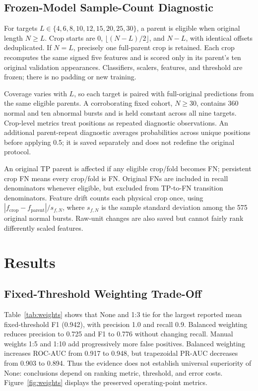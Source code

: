 \documentclass[10pt,twocolumn,letterpaper]{article}
\begin{document}
\subsection{Frozen-Model Sample-Count Diagnostic}
For targets $L\in\{4,6,8,10,12,15,20,25,30\}$, a parent is eligible when original length $N\geq L$. Crop starts are 0, $\lfloor(N-L)/2\rfloor$, and $N-L$, with identical offsets deduplicated. If $N=L$, precisely one full-parent crop is retained. Each crop recomputes the same signed five features and is scored only in its parent's ten original validation appearances. Classifiers, scalers, features, and threshold are frozen; there is no padding or new training.

Coverage varies with $L$, so each target is paired with full-original predictions from the same eligible parents. A corroborating fixed cohort, $N\geq30$, contains 360 normal and ten abnormal bursts and is held constant across all nine targets. Crop-level metrics treat positions as repeated diagnostic observations. An additional parent-repeat diagnostic averages probabilities across unique positions before applying 0.5; it is saved separately and does not redefine the original protocol.

An original TP parent is affected if any eligible crop/fold becomes FN; persistent crop FN means every crop/fold is FN. Original FNs are included in recall denominators whenever eligible, but excluded from TP-to-FN transition denominators. Feature drift counts each physical crop once, using $|f_{\mathrm{crop}}-f_{\mathrm{parent}}|/s_{f,N}$, where $s_{f,N}$ is the sample standard deviation among the 575 original normal bursts. Raw-unit changes are also saved but cannot fairly rank differently scaled features.

\section{Results}
\subsection{Fixed-Threshold Weighting Trade-Off}
Table~\ref{tab:weights} shows that None and 1:3 tie for the largest reported mean fixed-threshold F1 (0.942), with precision 1.0 and recall 0.9. Balanced weighting reduces precision to 0.725 and F1 to 0.776 without changing recall. Manual weights 1:5 and 1:10 add progressively more false positives. Balanced weighting increases ROC-AUC from 0.917 to 0.948, but trapezoidal PR-AUC decreases from 0.903 to 0.894. Thus the evidence does not establish universal superiority of None: conclusions depend on ranking metric, threshold, and error costs. Figure~\ref{fig:weights} displays the preserved operating-point metrics.
\end{document}
